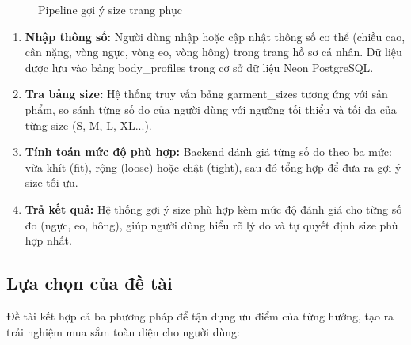 \begin{figure}[H]
\centering
{}
\caption{Pipeline gợi ý size trang phục}
\label{fig:size_pipeline}
\end{figure}

\begin{enumerate}
    \item \textbf{Nhập thông số:} Người dùng nhập hoặc cập nhật thông số cơ thể (chiều cao, cân nặng, vòng ngực, vòng eo, vòng hông) trong trang hồ sơ cá nhân. Dữ liệu được lưu vào bảng body\_profiles trong cơ sở dữ liệu Neon PostgreSQL.
    \item \textbf{Tra bảng size:} Hệ thống truy vấn bảng garment\_sizes tương ứng với sản phẩm, so sánh từng số đo của người dùng với ngưỡng tối thiểu và tối đa của từng size (S, M, L, XL...).
    \item \textbf{Tính toán mức độ phù hợp:} Backend đánh giá từng số đo theo ba mức: vừa khít (fit), rộng (loose) hoặc chật (tight), sau đó tổng hợp để đưa ra gợi ý size tối ưu.
    \item \textbf{Trả kết quả:} Hệ thống gợi ý size phù hợp kèm mức độ đánh giá cho từng số đo (ngực, eo, hông), giúp người dùng hiểu rõ lý do và tự quyết định size phù hợp nhất.
\end{enumerate}
\subsection{Lựa chọn của đề tài}
Đề tài kết hợp cả ba phương pháp để tận dụng ưu điểm của từng hướng, tạo ra trải nghiệm mua sắm toàn diện cho người dùng:

